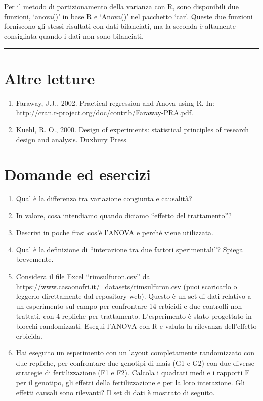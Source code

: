 \documentclass[
  12pt,
]{book}
\providecommand{\tightlist}{%
  \setlength{\itemsep}{0pt}\setlength{\parskip}{0pt}}
\begin{document}
Per il metodo di partizionamento della varianza con R, sono disponibili due funzioni, `anova()' in base R e `Anova()' nel pacchetto `car'. Queste due funzioni forniscono gli stessi risultati con dati bilanciati, ma la seconda è altamente consigliata quando i dati non sono bilanciati.

\begin{center}\rule{0.5\linewidth}{0.5pt}\end{center}

\hypertarget{altre-letture-3}{%
\section{Altre letture}\label{altre-letture-3}}

\begin{enumerate}
\def\labelenumi{\arabic{enumi}.}
\tightlist
\item
  Faraway, J.J., 2002. Practical regression and Anova using R. In: \url{http://cran.r-project.org/doc/contrib/Faraway-PRA.pdf}.
\item
  Kuehl, R. O., 2000. Design of experiments: statistical principles of research design and analysis. Duxbury Press
\end{enumerate}

\hypertarget{domande-ed-esercizi-2}{%
\section{Domande ed esercizi}\label{domande-ed-esercizi-2}}

\begin{enumerate}
\def\labelenumi{\arabic{enumi}.}
\tightlist
\item
  Qual è la differenza tra variazione congiunta e causalità?
\item
  In valore, cosa intendiamo quando diciamo ``effetto del trattamento''?
\item
  Descrivi in poche frasi cos'è l'ANOVA e perché viene utilizzata.
\item
  Qual è la definizione di ``interazione tra due fattori sperimentali''? Spiega brevemente.
\item
  Considera il file Excel ``rimsulfuron.csv'' da \url{https://www.casaonofri.it/_datasets/rimsulfuron.csv} (puoi scaricarlo o leggerlo direttamente dal repository web). Questo è un set di dati relativo a un esperimento sul campo per confrontare 14 erbicidi e due controlli non trattati, con 4 repliche per trattamento. L'esperimento è stato progettato in blocchi randomizzati. Esegui l'ANOVA con R e valuta la rilevanza dell'effetto erbicida.
\item
  Hai eseguito un esperimento con un layout completamente randomizzato con due repliche, per confrontare due genotipi di mais (G1 e G2) con due diverse strategie di fertilizzazione (F1 e F2). Calcola i quadrati medi e i rapporti F per il genotipo, gli effetti della fertilizzazione e per la loro interazione. Gli effetti causali sono rilevanti? Il set di dati è mostrato di seguito.
\end{enumerate}
\end{document}

